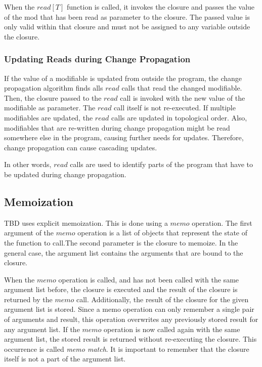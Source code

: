 When the $read[T]$ function is called, it invokes the closure and passes the value of the mod that has been read as parameter to the closure. The passed value is only valid within that closure and must not be assigned to any variable outside the closure. 

\subsubsection{Updating Reads during Change Propagation}

If the value of a modifiable is updated from outside the program, the change propagation algorithm finds alls $read$ calls that read the changed modifiable. Then, the closure passed to the $read$ call is invoked with the new value of the modifiable as parameter. The $read$ call itself is not re-executed. If multiple modifiables are updated, the $read$ calls are updated in topological order. Also, modifiables that are re-written during change propagation might be read somewhere else in the program, causing further needs for updates. Therefore, change propagation can cause cascading updates.

In other words, $read$ calls are used to identify parts of the program that have to be updated during change propagation. 

\subsection{Memoization}

TBD uses explicit memoization. This is done using a $memo$ operation. The first argument of the $memo$ operation is a list of objects that represent the state of the function to call.The second parameter is the closure to memoize. In the general case, the argument list contains the arguments that are bound to the closure. 

When the $memo$ operation is called, and has not been called with the same argument list before, the closure is executed and the result of the closure is returned by the $memo$ call. Additionally, the result of the closure for the given argument list is stored. Since a memo operation can only remember a single pair of arguments and result, this operation overwrites any previously stored result for any argument list. If the $memo$ operation is now called again with the same argument list, the stored result is returned without re-executing the closure. This occurrence is called \textit{memo match}. It is important to remember that the closure itself is not a part of the argument list. 

